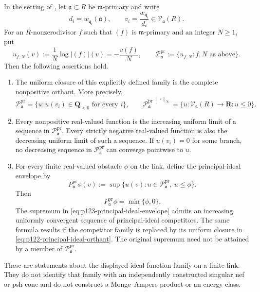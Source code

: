 \begin{theorem}
\label{thm:p122-curve-principal-ideal-envelope}
In the setting of
, let
\(\mathfrak a\subset R\) be \(\mathfrak m\)-primary and write
\[
 d_i=w_{\mathfrak q_i}(\mathfrak a),
 \qquad v_i=\frac{w_{\mathfrak q_i}}{d_i}
       \in\mathcal V_{\mathfrak a}(R).
\]
For an \(R\)-nonzerodivisor \(f\) such that \((f)\) is
\(\mathfrak m\)-primary and an integer \(N\geq1\), put
\[
 u_{f,N}(v):=\frac1N\log|(f)|(v)=-\frac{v(f)}N,
 \qquad
 \mathscr P_{\mathfrak a}^{\mathrm{pr}}
 :=\{u_{f,N}:f,N\text{ as above}\}.
 \tag{\(\diamondsuit\)}\label{eq:p122-principal-ideal-profile-family}
\]
Then the following assertions hold.
\begin{enumerate}
\item The uniform closure of this explicitly defined family is the complete
      nonpositive orthant.  More precisely,
      \[
       \mathscr P_{\mathfrak a}^{\mathrm{pr}}
       =\{u:u(v_i)\in\mathbf Q_{<0}\text{ for every }i\},
       \qquad
       \overline{\mathscr P_{\mathfrak a}^{\mathrm{pr}}}^{\,\|\cdot\|_\infty}
       =\{u:\mathcal V_{\mathfrak a}(R)\to\mathbf R:u\leq0\}.
       \tag{\(\heartsuit\)}\label{eq:p122-principal-ideal-orthant}
      \]
\item Every nonpositive real-valued function is the increasing uniform limit
      of a sequence in \(\mathscr P_{\mathfrak a}^{\mathrm{pr}}\).  Every
      strictly negative real-valued function is also the decreasing uniform
      limit of such a sequence.  If \(u(v_i)=0\) for some branch, no
      decreasing sequence in \(\mathscr P_{\mathfrak a}^{\mathrm{pr}}\)
      can converge pointwise to \(u\).
\item For every finite real-valued obstacle \(\phi\) on the link, define the
      principal-ideal envelope by
      \[
       P_{\mathfrak a}^{\mathrm{pr}}\phi(v)
       :=\sup\{u(v):u\in\mathscr P_{\mathfrak a}^{\mathrm{pr}},\ u\leq\phi\}.
       \tag{\(\star\)}\label{eq:p123-principal-ideal-envelope}
      \]
      Then
      \[
                         P_{\mathfrak a}^{\mathrm{pr}}\phi
                              =\min\{\phi,0\}.
       \tag{\(\dagger\)}\label{eq:p123-principal-ideal-envelope-formula}
      \]
      The supremum in \eqref{eq:p123-principal-ideal-envelope} admits an
      increasing uniformly convergent sequence of principal-ideal
      competitors.  The same formula results if the competitor family is
      replaced by its uniform closure in
      \eqref{eq:p122-principal-ideal-orthant}.  The original supremum need
      not be attained by a member of
      \(\mathscr P_{\mathfrak a}^{\mathrm{pr}}\).
\end{enumerate}
These are statements about the displayed ideal-function family on a finite
link.  They do not identify that family with an independently constructed
singular nef or psh cone and do not construct a Monge--Ampere product or an
energy class.
\end{theorem}

